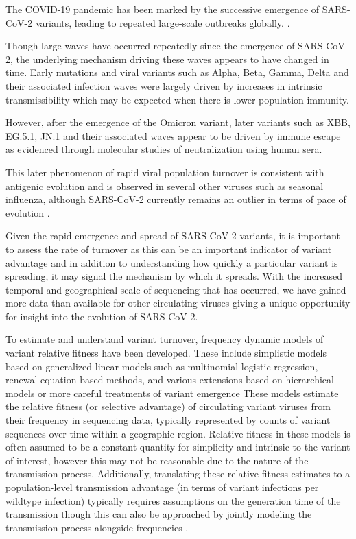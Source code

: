 \documentclass[12pt,oneside,letterpaper]{article}
\begin{document}

The COVID-19 pandemic has been marked by the successive emergence of SARS-CoV-2 variants, leading to repeated large-scale outbreaks globally. \cite{tegally2021detection, Volz2021}.

Though large waves have occurred repeatedly since the emergence of SARS-CoV-2, the underlying mechanism driving these waves appears to have changed in time.
Early mutations and viral variants such as Alpha, Beta, Gamma, Delta and their associated infection waves were largely driven by increases in intrinsic transmissibility which may be expected when there is lower population immunity.

However, after the emergence of the Omicron variant, later variants such as XBB, EG.5.1, JN.1 and their associated waves appear to be driven by immune escape as evidenced through molecular studies of neutralization using human sera.\cite{Cao2021, Cao2022, Bekliz2024, Jian2023}

This later phenomenon of rapid viral population turnover is consistent with antigenic evolution and is observed in several other viruses such as seasonal influenza, although SARS-CoV-2 currently remains an outlier in terms of pace of evolution \cite{Koel2013, Bedford2014, kistler2023atlas}.

Given the rapid emergence and spread of SARS-CoV-2 variants, it is important to assess the rate of turnover as this can be an important indicator of variant advantage and in addition to understanding how quickly a particular variant is spreading, it may signal the mechanism by which it spreads.
With the increased temporal and geographical scale of sequencing that has occurred, we have gained more data than available for other circulating viruses giving a unique opportunity for insight into the evolution of SARS-CoV-2.

To estimate and understand variant turnover, frequency dynamic models of variant relative fitness have been developed.
These include simplistic models based on generalized linear models such as multinomial logistic regression, renewal-equation based methods, and various extensions based on hierarchical models or more careful treatments of variant emergence  \cite{susswein2023leveraging, figgins2022sars, Piantham2022, Annavajhala2021, Lefrancq2023}
These models estimate the relative fitness (or selective advantage) of circulating variant viruses from their frequency in sequencing data, typically represented by counts of variant sequences over time within a geographic region.
Relative fitness in these models is often assumed to be a constant quantity for simplicity and intrinsic to the variant of interest, however this may not be reasonable due to the nature of the transmission process.
Additionally, translating these relative fitness estimates to a population-level transmission advantage (in terms of variant infections per wildtype infection) typically requires assumptions on the generation time of the transmission though this can also be approached by jointly modeling the transmission process alongside frequencies \cite{Wallinga2006, figgins2022sars}.
\end{document}

